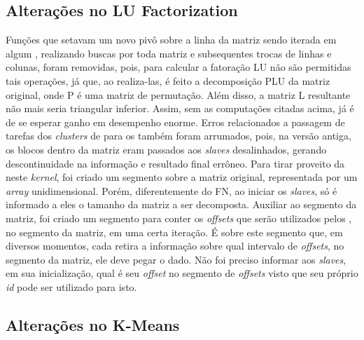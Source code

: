 \documentclass[a4paper,11pt]{article}
\begin{document}
\subsection{Alterações no LU Factorization}

Funções que setavam um novo pivô sobre a linha da matriz sendo iterada em algum \cc , realizando buscas por toda matriz e subsequentes trocas de linhas e colunas, foram removidas, pois, para calcular a fatoração LU não são permitidas tais operações, já que, ao realiza-las, é feito a decomposição PLU da matriz original, onde P é uma matriz de permutação. Além disso, a matriz L resultante não mais seria triangular inferior. Assim, sem as computações citadas acima, já é de se esperar ganho em desempenho enorme. Erros relacionados a passagem de tarefas dos \textit{clusters} de \io para os \ccs também foram arrumados, pois, na versão antiga, os blocos dentro da matriz eram passados aos \textit{slaves} desalinhados, gerando descontinuidade na informação e resultado final errôneo. Para tirar proveito da \async neste \textit{kernel}, foi criado um segmento sobre a matriz original, representada por um \textit{array} unidimensional. Porém, diferentemente do FN, ao iniciar os \textit{slaves}, só é informado a eles o tamanho da matriz a ser decomposta. Auxiliar ao segmento da matriz, foi criado um segmento para conter os \textit{offsets} que serão utilizados pelos \ccs, no segmento da matriz, em uma certa iteração. É sobre este segmento que, em diversos momentos, cada \cc retira a informação sobre qual intervalo de \textit{offsets}, no segmento da matriz, ele deve pegar o dado. Não foi preciso informar aos \textit{slaves}, em sua inicialização, qual é seu \textit{offset} no segmento de \textit{offsets} visto que seu próprio \textit{id} pode ser utilizado para isto.
\subsection{Alterações no K-Means}
\end{document}
